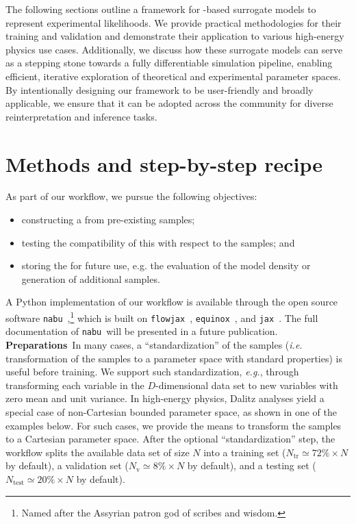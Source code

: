 \documentclass[aps,nofootinbib,superscriptaddress,reprint,preprintnumbers]{revtex4-1}
\newcommand{\ie}{\textit{i.e.}\xspace}
\newcommand{\eg}{\textit{e.g.}\xspace}
\newcommand{\nabu}{\texttt{nabu}\xspace}
\begin{document}
The following sections outline a framework for \NF-based surrogate models to represent experimental likelihoods. We provide practical methodologies for their training and validation and demonstrate their application to various high-energy physics use cases. Additionally, we discuss how these surrogate models can serve as a stepping stone towards a fully differentiable simulation pipeline, enabling efficient, iterative exploration of theoretical and experimental parameter spaces. By intentionally designing our framework to be user-friendly and broadly applicable, we ensure that it can be adopted across the community for diverse reinterpretation and inference tasks.


\section{Methods and step-by-step recipe}

As part of our workflow, we pursue the following objectives:
\begin{itemize}
    \item constructing a \LM from pre-existing samples;
    \item testing the compatibility of this \LM with respect to the samples; and
    \item storing the \LM for future use, e.g. the evaluation of the model density or generation of additional samples.
\end{itemize}
A Python implementation of our workflow is available through the open source software \nabu~\cite{NABU:Software},\footnote{%
Named after the Assyrian patron god of scribes and wisdom.
}
which is built on \texttt{flowjax}~\cite{flowjax}, \texttt{equinox}~\cite{equinox}, and \texttt{jax}~\cite{jax}.
The full documentation of \nabu~will be presented in a future publication.\\

\noindent
\textbf{Preparations}~In many cases, a ``standardization'' of the samples (\ie transformation of the samples to a parameter space with standard properties) is useful before training.
We support such standardization, \eg, through transforming each variable in the $D$-dimensional data set to new variables with zero mean and unit variance.
In high-energy physics, Dalitz analyses yield a special case of non-Cartesian bounded parameter space, as shown in one of the
examples below. For such cases, we provide the means to transform the samples to a Cartesian parameter space.
After the optional ``standardization'' step, the workflow splits the available data set of size $N$ into a training set ($N_\text{tr} \simeq 72\% \times N$ by default),
a validation set ($N_\text{v} \simeq 8\% \times N$ by default), and a testing set ($N_\text{test} \simeq 20\%\times N$ by default).
\\
\end{document}
